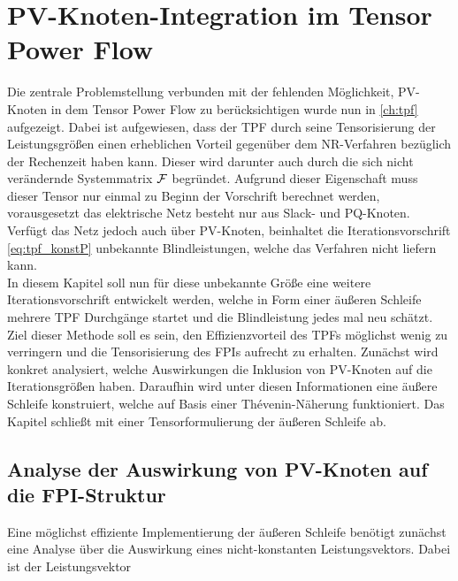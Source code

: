 \chapter{PV-Knoten-Integration im Tensor Power Flow}
\label{ch:methoden_pv}


Die zentrale Problemstellung verbunden mit der fehlenden Möglichkeit, PV-Knoten in dem Tensor Power Flow zu berücksichtigen wurde nun in \cref{ch:tpf} aufgezeigt. 
Dabei ist aufgewiesen, dass der TPF durch seine Tensorisierung der Leistungsgrößen einen erheblichen Vorteil gegenüber dem NR-Verfahren bezüglich der Rechenzeit haben kann.
Dieser wird darunter auch durch die sich nicht verändernde Systemmatrix $\mathcal{F}$ begründet.
Aufgrund dieser Eigenschaft muss dieser Tensor nur einmal zu Beginn der Vorschrift berechnet werden, vorausgesetzt das elektrische Netz besteht nur aus Slack- und PQ-Knoten.
Verfügt das Netz jedoch auch über PV-Knoten, beinhaltet die Iterationsvorschrift \eqref{eq:tpf_konstP} unbekannte Blindleistungen, welche das Verfahren nicht liefern kann.\\

In diesem Kapitel soll nun für diese unbekannte Größe eine weitere Iterationsvorschrift entwickelt werden, welche in Form einer äußeren Schleife mehrere TPF Durchgänge startet und die Blindleistung jedes mal neu schätzt.
Ziel dieser Methode soll es sein, den Effizienzvorteil des TPFs möglichst wenig zu verringern und die Tensorisierung des FPIs aufrecht zu erhalten.
Zunächst wird konkret analysiert, welche Auswirkungen die Inklusion von PV-Knoten auf die Iterationsgrößen haben.
Daraufhin wird unter diesen Informationen eine äußere Schleife konstruiert, welche auf Basis einer Thévenin-Näherung funktioniert.
Das Kapitel schließt mit einer Tensorformulierung der äußeren Schleife ab.

\section{Analyse der Auswirkung von PV-Knoten auf die FPI-Struktur}
\label{sec:pv_auswirkung}


Eine möglichst effiziente Implementierung der äußeren Schleife benötigt zunächst eine Analyse über die Auswirkung eines nicht-konstanten Leistungsvektors.
Dabei ist der Leistungsvektor

